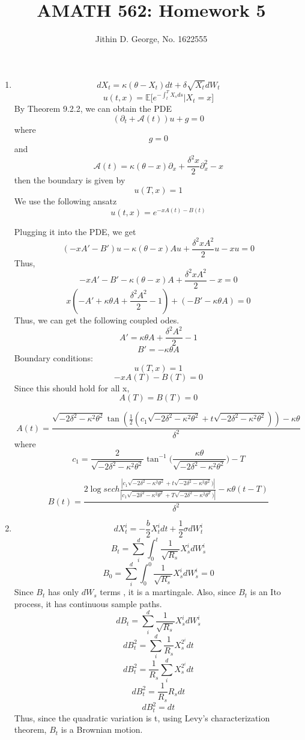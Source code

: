 \documentclass[a4paper,11pt]{article}
\title{AMATH 562: Homework 5}
\author{Jithin D. George, No. 1622555}
\begin{document}
\maketitle
\begin{enumerate}

\item 
\[dX_t = \kappa(\theta -X_t)dt + \delta \sqrt{X_t} dW_t\]
\[u(t,x) = \mathbb{E}\bigg[e^{- \int_t^T X_s ds}|X_t = x\bigg]\]
By Theorem 9.2.2, we can obtain the PDE
\[(\partial_t + \mathcal{A}(t))u +g = 0\]
where 
\[g = 0\]
 and 
\[\mathcal{A}(t)  =\kappa(\theta -x)\partial_x+\frac{\delta^2 x}{2}\partial_x^2 - x\]
then the boundary is given by
\[u(T,x) = 1\]
We use the following ansatz
\[u(t,x)= e^{-xA(t)-B(t)}\]

Plugging it into the PDE, we get
\[(-xA'-B')u-\kappa(\theta -x)Au+\frac{\delta^2 xA^2}{2}u-xu=0\]
Thus,
\[-xA'-B'-\kappa(\theta -x)A+\frac{\delta^2 x A^2}{2}-x=0\]
\[x(-A'+\kappa\theta A+\frac{\delta^2 A^2}{2}-1)+(-B'-\kappa\theta A)=0\]
Thus, we can get the following coupled odes.
\[A'=\kappa\theta A+\frac{\delta^2 A^2}{2}-1\]
\[B'=-\kappa\theta A\]
Boundary conditions:
\[u(T,x)=1\]
\[-xA(T)-B(T)=0\]
Since this should hold for all x,
\[A(T)=B(T)=0\]

\[A(t) = \frac{\sqrt{-2\delta^2-\kappa^2\theta^2}\tan(\frac{1}{2}(c_1\sqrt{-2\delta^2-\kappa^2\theta^2}+t\sqrt{-2\delta^2-\kappa^2\theta^2} ) )-\kappa\theta}{\delta^2}\]
where
\[c_1 = \frac{2}{\sqrt{-2\delta^2-\kappa^2\theta^2}}\tan^{-1}\bigg(\frac{\kappa\theta}{\sqrt{-2\delta^2-\kappa^2\theta^2}}\bigg)-T\]

\[B(t) = \frac{2\log sech \frac{|c_1\sqrt{-2\delta^2-\kappa^2\theta^2}+t\sqrt{-2\delta^2-\kappa^2\theta^2} )|}{ |c_1\sqrt{-2\delta^2-\kappa^2\theta^2}+T\sqrt{-2\delta^2-\kappa^2\theta^2} )|}-\kappa\theta (t-T)}{\delta^2}\]

\item 
\[dX_t^i = -\frac{b}{2}X_t^{i}dt+ \frac{1}{2} \sigma dW_t^i\]
\[B_t = \sum_i^d \int_0^t \frac{1}{\sqrt{R_s}}X_s^{i}dW_s^{i}\]
\[B_0 = \sum_i^d \int_0^0 \frac{1}{\sqrt{R_s}}X_s^{i}dW_s^{i}=0\]
Since $B_t$ has only $dW_s$ terms , it is a martingale.
Also, since $B_t$ is an Ito process, it has continuous sample paths.
\[dB_t = \sum_i^d \frac{1}{\sqrt{R_s}}X_s^{i}dW_s^{i}\] 
\[dB_t^2 = \sum_i^d \frac{1}{R_s}X_s^{2^{i}}dt\]
\[dB_t^2 = \frac{1}{R_s} \sum_i^d X_s^{2^{i}}dt\]
\[dB_t^2 = \frac{1}{R_s} R_s dt\]
\[dB_t^2 = dt\]
Thus, since the quadratic variation is t, using Levy's characterization theorem, $B_t$ is a Brownian motion.


\end{enumerate}
\end{document}
